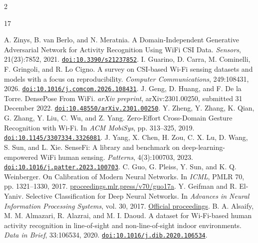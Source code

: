 \documentclass[a4paper,11pt,fleqn]{mira-author}
\begin{document}
\onecolumn
\begingroup
\begin{multicols}{2}
\fontsize{9}{11.3}\selectfont



\renewcommand{\bibfont}{\normalfont\fontsize{9}{11.3}\selectfont}
\setlength{\bibsep}{3pt}
\begin{thebibliography}{17}
\raggedright
{}
A. Zinys, B. van Berlo, and N. Meratnia. A Domain-Independent Generative Adversarial Network for Activity Recognition Using WiFi CSI Data. \textit{Sensors}, 21(23):7852, 2021. \href{https://doi.org/10.3390/s21237852}{\nolinkurl{doi:10.3390/s21237852}}.
I. Guarino, D. Carra, M. Cominelli, F. Gringoli, and R. Lo Cigno. A survey on CSI-based Wi-Fi sensing datasets and models with a focus on reproducibility. \textit{Computer Communications}, 249:108431, 2026. \href{https://doi.org/10.1016/j.comcom.2026.108431}{\nolinkurl{doi:10.1016/j.comcom.2026.108431}}.
J. Geng, D. Huang, and F. De la Torre. DensePose From WiFi. \textit{arXiv preprint}, arXiv:2301.00250, submitted 31 December 2022. \href{https://doi.org/10.48550/arXiv.2301.00250}{\nolinkurl{doi:10.48550/arXiv.2301.00250}}.
Y. Zheng, Y. Zhang, K. Qian, G. Zhang, Y. Liu, C. Wu, and Z. Yang. Zero-Effort Cross-Domain Gesture Recognition with Wi-Fi. In \textit{ACM MobiSys}, pp. 313--325, 2019. \href{https://doi.org/10.1145/3307334.3326081}{\nolinkurl{doi:10.1145/3307334.3326081}}.
J. Yang, X. Chen, H. Zou, C. X. Lu, D. Wang, S. Sun, and L. Xie. SenseFi: A library and benchmark on deep-learning-empowered WiFi human sensing. \textit{Patterns}, 4(3):100703, 2023. \href{https://doi.org/10.1016/j.patter.2023.100703}{\nolinkurl{doi:10.1016/j.patter.2023.100703}}.
C. Guo, G. Pleiss, Y. Sun, and K. Q. Weinberger. On Calibration of Modern Neural Networks. In \textit{ICML}, PMLR 70, pp. 1321--1330, 2017. \href{https://proceedings.mlr.press/v70/guo17a.html}{proceedings.mlr.press/v70/guo17a}.
Y. Geifman and R. El-Yaniv. Selective Classification for Deep Neural Networks. In \textit{Advances in Neural Information Processing Systems}, vol. 30, 2017. \href{https://papers.nips.cc/paper_files/paper/2017/hash/4a8423d5e91fda00bb7e46540e2b0cf1-Abstract.html}{Official proceedings}.
B. A. Alsaify, M. M. Almazari, R. Alazrai, and M. I. Daoud. A dataset for Wi-Fi-based human activity recognition in line-of-sight and non-line-of-sight indoor environments. \textit{Data in Brief}, 33:106534, 2020. \href{https://doi.org/10.1016/j.dib.2020.106534}{\nolinkurl{doi:10.1016/j.dib.2020.106534}}.

\end{thebibliography}
\end{multicols}
\end{document}
